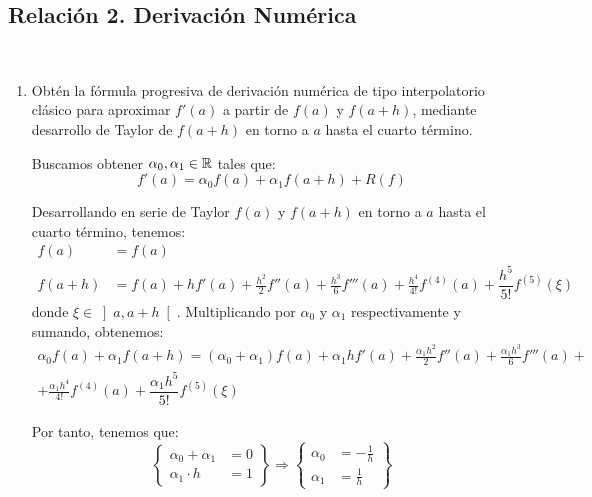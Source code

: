 \subsection{Relación 2. Derivación Numérica}
\setcounter{ejercicio}{0}


\begin{ejercicio}\label{ej:2.2.1}~
    \begin{enumerate}
        \item Obtén la fórmula progresiva de derivación numérica de tipo interpolatorio clásico para aproximar $f'(a)$ a partir de $f(a)$ y $f(a + h)$, mediante desarrollo de Taylor de $f(a + h)$ en torno a $a$ hasta el cuarto término.
        
        Buscamos obtener $\alpha_0,\alpha_1\in \mathbb{R}$ tales que:
        \begin{equation*}
            f'(a) = \alpha_0 f(a) + \alpha_1 f(a + h) + R(f)
        \end{equation*}

        Desarrollando en serie de Taylor $f(a)$ y $f(a + h)$ en torno a $a$ hasta el cuarto término, tenemos:
        \begin{align*}
            f(a) &= f(a) \\
            f(a + h) &= f(a) + hf'(a) + \frac{h^2}{2}f''(a) + \frac{h^3}{6}f'''(a) + \frac{h^4}{4!}f^{(4)}(a) + \dfrac{h^5}{5!}f^{(5)}(\xi)
        \end{align*}
        donde $\xi\in\left]a,a+h\right[$. Multiplicando por $\alpha_0$ y $\alpha_1$ respectivamente y sumando, obtenemos:
        \begin{multline*}
            \alpha_0 f(a) + \alpha_1 f(a + h) = (\alpha_0 + \alpha_1)f(a) + \alpha_1hf'(a) + \frac{\alpha_1h^2}{2}f''(a) + \frac{\alpha_1h^3}{6}f'''(a) +\\+ \frac{\alpha_1h^4}{4!}f^{(4)}(a) + \dfrac{\alpha_1h^5}{5!}f^{(5)}(\xi)
        \end{multline*}

        Por tanto, tenemos que:
        \begin{equation*}
            \left\{\begin{aligned}
                \alpha_0 + \alpha_1 &= 0 \\
                \alpha_1\cdot h &= 1
            \end{aligned}\right\}
            \Longrightarrow
            \left\{\begin{aligned}
                \alpha_0 &= -\frac{1}{h} \\
                \alpha_1 &= \frac{1}{h}
            \end{aligned}\right\}
        \end{equation*}


\end{enumerate}
\end{ejercicio}
